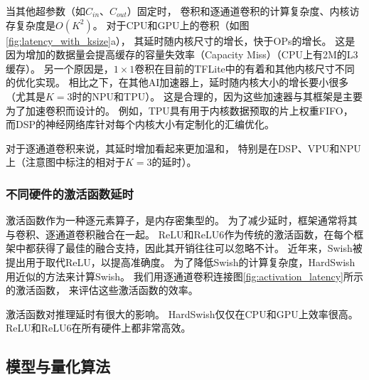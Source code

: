 当其他超参数（如$C_{in}$、$C_{out}$）固定时，
卷积和逐通道卷积的计算复杂度、内核访存复杂度是$O(K^2)$。
对于CPU和GPU上的卷积（如图\ref{fig:latency_with_ksize}a），
其延时随内核尺寸的增长，快于OPs的增长。
这是因为增加的数据量会提高缓存的容量失效率（Capacity Miss）（CPU上有2M的L3缓存）。
另一个原因是，$1\times 1$卷积在目前的TFLite中的有着和其他内核尺寸不同的优化实现。
相比之下，在其他AI加速器上，延时随内核大小的增长要小很多（尤其是$K=3$时的NPU和TPU）。
这是合理的，因为这些加速器与其框架是主要为了加速卷积而设计的。
例如，TPU具有用于内核数据预取的片上权重FIFO，
而DSP的神经网络库针对每个内核大小有定制化的汇编优化。

对于逐通道卷积来说，其延时增加看起来更加温和，
特别是在DSP、VPU和NPU上（注意图中标注的相对于$K=3$的延时）。

\subsubsection{不同硬件的激活函数延时}
\label{analysis:op block:activation with hardware}


激活函数作为一种逐元素算子，是内存密集型的。
为了减少延时，框架通常将其与卷积、逐通道卷积融合在一起。
ReLU和ReLU6作为传统的激活函数，在每个框架中都获得了最佳的融合支持，因此其开销往往可以忽略不计。
近年来，Swish被提出用于取代ReLU，以提高准确度。
为了降低Swish的计算复杂度，HardSwish用近似的方法来计算Swish。
我们用逐通道卷积连接图\ref{fig:activation_latency}所示的激活函数，
来评估这些激活函数的效率。

\begin{finding}
    激活函数对推理延时有很大的影响。
    HardSwish仅仅在CPU和GPU上效率很高。
    ReLU和ReLU6在所有硬件上都非常高效。
\end{finding}

\subsection{模型与量化算法}
\label{analysis:model quantization}